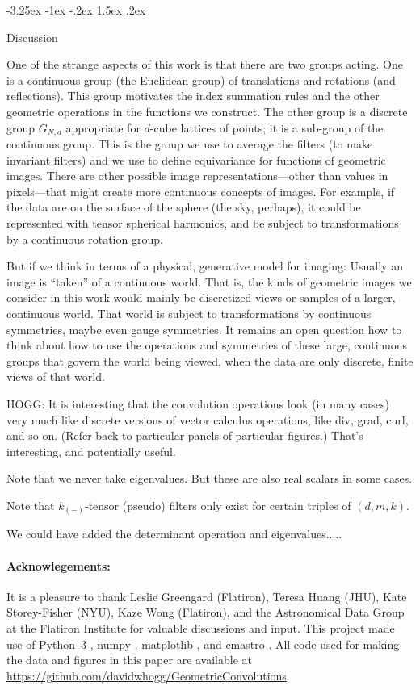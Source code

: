\documentclass{article}
\makeatletter
\theoremstyle{definition}
\newcommand{\tensorname}[2]{{#1}_{(#2)}}
\newcommand{\tensor}[2]{$\tensorname{#1}{#2}$-tensor}
\renewcommand\section{\@startsection {section}{1}{\z@}%
  {-3.25ex \@plus -1ex \@minus -.2ex}%
  {1.5ex \@plus .2ex}%
  {\raggedright\normalfont\large\bfseries}}%
\makeatother
\begin{document}
\section{Discussion}\label{sec:discussion}

One of the strange aspects of this work is that there are two groups acting.
One is a continuous group (the Euclidean group) of translations and rotations (and reflections).
This group motivates the index summation rules and the other geometric operations in the functions we construct.
The other group is a discrete group $G_{N,d}$ appropriate for $d$-cube lattices of points; it is a sub-group of the continuous group.
This is the group we use to average the filters (to make invariant filters) and we use to define equivariance for functions of geometric images.
There are other possible image representations---other than values in pixels---that might create more continuous concepts of images.
For example, if the data are on the surface of the sphere (the sky, perhaps), it could be represented with tensor spherical harmonics, and be subject to transformations by a continuous rotation group.

But if we think in terms of a physical, generative model for imaging: Usually an image is ``taken'' of a continuous world.
That is, the kinds of geometric images we consider in this work would mainly be discretized views or samples of a larger, continuous world.
That world is subject to transformations by continuous symmetries, maybe even gauge symmetries.
It remains an open question how to think about how to use the operations and symmetries of these large, continuous groups that govern the world being viewed, when the data are only discrete, finite views of that world.

HOGG: It is interesting that the convolution operations look (in many cases) very much like discrete versions of vector calculus operations, like div, grad, curl, and so on.
(Refer back to particular panels of particular figures.)
That's interesting, and potentially useful.

Note that we never take eigenvalues. But these are also real scalars in some cases.

Note that \tensor{k}{-} (pseudo) filters only exist for certain triples of $(d, m, k)$.

We could have added the determinant operation and eigenvalues.....

\paragraph{Acknowlegements:}
It is a pleasure to thank
Leslie Greengard (Flatiron),
Teresa Huang (JHU),
Kate Storey-Fisher (NYU),
Kaze Wong (Flatiron),
and the Astronomical Data Group at the Flatiron Institute for valuable discussions and input.
This project made use of Python~3 \cite{python3}, numpy \cite{numpy}, matplotlib \cite{matplotlib}, and cmastro \cite{cmastro}.
All code used for making the data and figures in this paper are available at \url{https://github.com/davidwhogg/GeometricConvolutions}.


\raggedright

\end{document}
